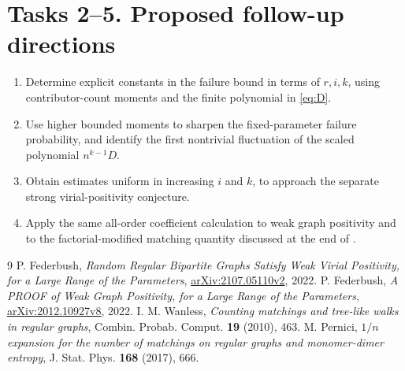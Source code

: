 \documentclass[11pt]{article}
\begin{document}
\section*{Tasks 2--5. Proposed follow-up directions}
\begin{enumerate}[label=\textbf{Task \arabic*.},start=2,leftmargin=*]
\item Determine explicit constants in the failure bound in terms of
$r,i,k$, using contributor-count moments and the finite polynomial
in \eqref{eq:D}.
\item Use higher bounded moments to sharpen the fixed-parameter
failure probability, and identify the first nontrivial fluctuation
of the scaled polynomial $n^{k-1}D$.
\item Obtain estimates uniform in increasing $i$ and $k$, to approach
the separate strong virial-positivity conjecture.
\item Apply the same all-order coefficient calculation to weak graph
positivity and to the factorial-modified matching quantity discussed
at the end of \cite{virial}.
\end{enumerate}
\begin{thebibliography}{9}
 P. Federbush, \emph{Random Regular Bipartite Graphs
Satisfy Weak Virial Positivity, for a Large Range of the Parameters},
\href{https://arxiv.org/abs/2107.05110v2}{arXiv:2107.05110v2}, 2022.
 P. Federbush, \emph{A PROOF of Weak Graph Positivity,
for a Large Range of the Parameters},
\href{https://arxiv.org/abs/2012.10927v8}{arXiv:2012.10927v8}, 2022.
 I. M. Wanless, \emph{Counting matchings and tree-like
walks in regular graphs}, Combin. Probab. Comput. \textbf{19} (2010), 463.
 M. Pernici, \emph{$1/n$ expansion for the number of
matchings on regular graphs and monomer-dimer entropy},
J. Stat. Phys. \textbf{168} (2017), 666.
\end{thebibliography}
\end{document}

